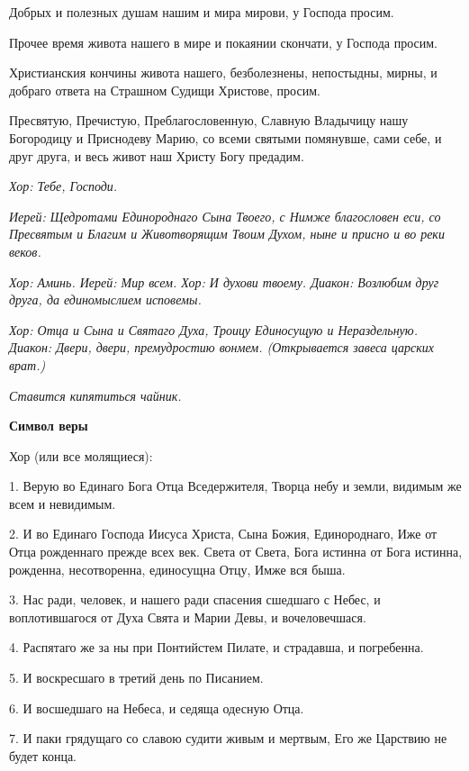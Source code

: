   Добрых и полезных душам нашим и мира мирови, у Господа просим. 


  Прочее время живота нашего в мире и покаянии скончати, у Господа просим. 


  Христианския кончины живота нашего, безболезнены, непостыдны, мирны, и добраго ответа на Страшном Судищи Христове, просим. 


  Пресвятую, Пречистую, Преблагословенную, Славную Владычицу нашу Богородицу и Приснодеву Марию, со всеми святыми помянувше, сами себе, и друг друга, и весь живот наш Христу Богу предадим.


\itshape Хор:\normalfont{} Тебе, Господи.


\itshape Иерей:\normalfont{} Щедротами Единороднаго Сына Твоего, с Нимже благословен еси, со Пресвятым и Благим и Животворящим Твоим Духом, ныне и присно и во реки веков.


\itshape Хор:\normalfont{} Аминь. \itshape  Иерей:\normalfont{} Мир всем. \itshape  Хор:\normalfont{} И духови твоему. \itshape  Диакон:\normalfont{} Возлюбим друг друга, да единомыслием исповемы.


\itshape Хор:\normalfont{} Отца и Сына и Святаго Духа, Троицу Единосущую и Нераздельную. \itshape  Диакон:\normalfont{} Двери, двери, премудростию вонмем. \itshape  (Открывается завеса царских врат\normalfont{}.)

 


\itshape  Ставится кипятиться чайник\normalfont{}. 


\medskip\bfseries  Символ веры \normalfont{}\nopagebreak


  Хор (или все молящиеся):


  1. Верую во Единаго Бога Отца Вседержителя, Творца небу и земли, видимым же всем и невидимым. 


  2. И во Единаго Господа Иисуса Христа, Сына Божия, Единороднаго, Иже от Отца рожденнаго прежде всех век. Света от Света, Бога истинна от Бога истинна, рожденна, несотворенна, единосущна Отцу, Имже вся быша.


  3. Нас ради, человек, и нашего ради спасения сшедшаго с Небес, и воплотившагося от Духа Свята и Марии Девы, и вочеловечшася.


  4. Распятаго же за ны при Понтийстем Пилате, и страдавша, и погребенна.


  5. И воскресшаго в третий день по Писанием.


  6. И восшедшаго на Небеса, и седяща одесную Отца.


  7. И паки грядущаго со славою судити живым и мертвым, Его же Царствию не будет конца.


